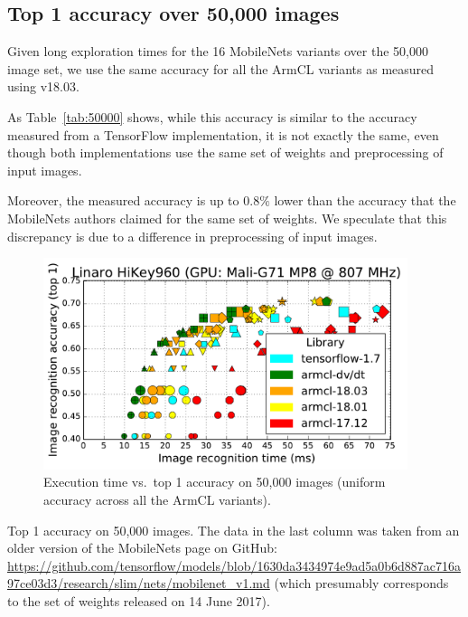 \documentclass[sigplan]{acmart}
\begin{document}
\subsection{Top 1 accuracy over 50,000 images}

Given long exploration times for the 16 MobileNets variants over the 50,000
image set, we use the same accuracy for all the ArmCL variants as measured
using v18.03.

As Table~\ref{tab:50000} shows, while this accuracy is similar to the accuracy
measured from a TensorFlow implementation, it is not exactly the same, even
though both implementations use the same set of weights and
preprocessing of input images.
 
Moreover, the measured accuracy is up to $0.8\%$ lower than the accuracy
that the MobileNets authors claimed for the same set of weights.
%
We speculate that this discrepancy is due to a difference in preprocessing of
input images.

\begin{figure}[htbp]
  \centering
  \includegraphics[width=0.95\textwidth]{figures/hikey-960-accuracy_top1_-50000-dv_dt__18_03__18_01__17_12__tf.pdf}
  \caption{Execution time vs.\ top 1 accuracy on 50,000 images (uniform accuracy across all the ArmCL variants).}
  \label{fig:50000}
\end{figure}


\begin{table}[htbp]
  \centering
  
  \caption{Top 1 accuracy on 50,000 images. The data in the last column was taken from an older version of the MobileNets page on GitHub: \url{https://github.com/tensorflow/models/blob/1630da3434974e9ad5a0b6d887ac716a97ce03d3/research/slim/nets/mobilenet_v1.md} (which presumably corresponds to the set of weights released on 14 June 2017).}
  \label{tab:50000}
\end{table}
\end{document}
